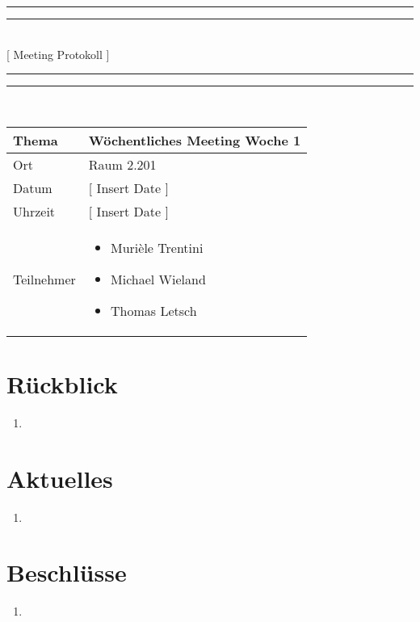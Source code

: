 \documentclass[11pt, a4paper,oneside]{scrartcl}
\begin{document}
\centering
\rule{\textwidth}{1.6pt}\vspace*{-\baselineskip}\vspace*{2pt} %
\rule{\textwidth}{0.4pt}\\[\baselineskip] %
{\LARGE [ Meeting Protokoll ]}\\[0.2\baselineskip] %
\rule{\textwidth}{0.4pt}\vspace*{-\baselineskip}\vspace{3.2pt} %
\rule{\textwidth}{1.6pt}\\[2\baselineskip] %

\begin{tabu} to \linewidth {l X }
	\toprule
	\textbf{Thema} & \textbf{Wöchentliches Meeting Woche 1} \\
	\midrule
	Ort & Raum 2.201 \\
	Datum & [ Insert Date ] \\
	Uhrzeit & [ Insert Date ] \\
	Teilnehmer & 
	\begin{minipage}[t]{\textwidth}
	  	\begin{itemize}
			\item Murièle Trentini
			\item Michael Wieland
			\item Thomas Letsch
	  	\end{itemize}
	\end{minipage}
	\\
	\bottomrule
\end{tabu}



\section{Rückblick}
\begin{enumerate}
	\item 
\end{enumerate}

\section{Aktuelles}
\begin{enumerate}
	\item 
\end{enumerate}

\section{Beschlüsse}
\begin{enumerate}
	\item 
\end{enumerate}
\end{document}
